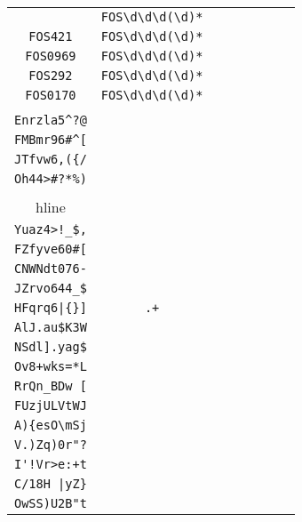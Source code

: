 \begin{longtable}{cccccccc}
\begin{tabular}{ll}
    \verb|FOS238| & \verb|FOS\d\d\d(\d)*|\\
\verb|FOS421| & \verb|FOS\d\d\d(\d)*|\\
\verb|FOS0969| & \verb|FOS\d\d\d(\d)*|\\
\verb|FOS292| & \verb|FOS\d\d\d(\d)*|\\
\verb|FOS0170| & \verb|FOS\d\d\d(\d)*|
\end{tabular}
\\\midrule 
\begin{tabular}{l}
    \verb|QWVvx22%{-|\\
\verb|Enrzla5^?@|\\
\verb|FMBmr96#^[|\\
\verb|JTfvw6,({/|\\
\verb|Oh44>#?*%)|\\
\\hline\\
\verb|Yuaz4>!_$,|\\
\verb|FZfyve60#[|\\
\verb|CNWNdt076-|\\
\verb|JZrvo644_$|\\
\verb.HFqrq6|{}].
\end{tabular}

&
\verb|.+|
&

\begin{tabular}{l}
    \verb|\u.........|\\
\verb|AlJ.au$K3W|\\
\verb|NSdl].yag$|\\
\verb|Ov8+wks=*L|\\
\verb|RrQn_BDw [|\\
\verb|FUzjULVtWJ|
\end{tabular}

&

\begin{tabular}{l}
    \verb|\u.........|\\
\verb|A){esO\mSj|\\
\verb|V.)Zq)0r"?|\\
\verb|I'!Vr>e:+t|\\
\verb.C/18H |yZ}.\\
\verb|OwSS)U2B"t|
\end{tabular}

&


\end{longtable}
